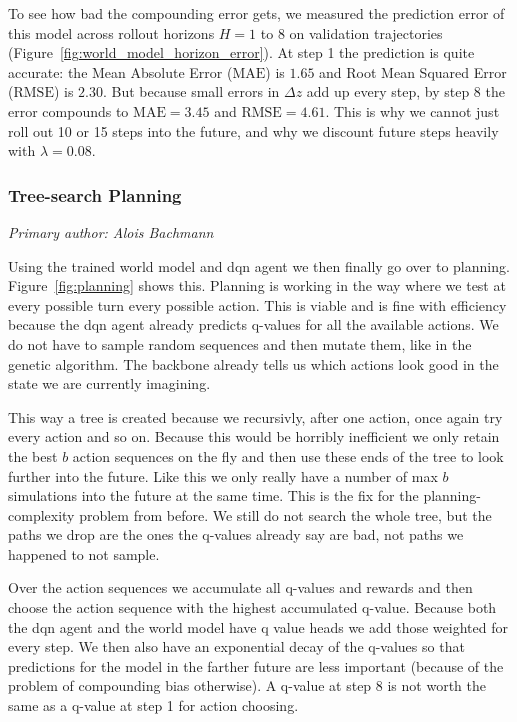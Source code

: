 To see how bad the compounding error gets, we measured the prediction error of this model across rollout horizons $H=1$ to $8$ on validation trajectories (Figure~\ref{fig:world_model_horizon_error}). At step 1 the prediction is quite accurate: the Mean Absolute Error ($\text{MAE}$) is $1.65$ and Root Mean Squared Error ($\text{RMSE}$) is $2.30$. But because small errors in $\Delta z$ add up every step, by step 8 the error compounds to $\text{MAE} = 3.45$ and $\text{RMSE} = 4.61$. This is why we cannot just roll out 10 or 15 steps into the future, and why we discount future steps heavily with $\lambda = 0.08$.

\subsubsection{Tree-search Planning}

\textit{Primary author: Alois Bachmann}

Using the trained world model and dqn agent we then finally go over to planning. Figure~\ref{fig:planning} shows this. Planning is working in the way where we test at every possible turn every possible action. This is viable and is fine with efficiency because the dqn agent already predicts q-values for all the available actions. We do not have to sample random sequences and then mutate them, like in the genetic algorithm. The backbone already tells us which actions look good in the state we are currently imagining.

This way a tree is created because we recursivly, after one action, once again try every action and so on. Because this would be horribly inefficient we only retain the best $b$ action sequences on the fly and then use these ends of the tree to look further into the future. Like this we only really have a number of max $b$ simulations into the future at the same time. This is the fix for the planning-complexity problem from before. We still do not search the whole tree, but the paths we drop are the ones the q-values already say are bad, not paths we happened to not sample.

Over the action sequences we accumulate all q-values and rewards and then choose the action sequence with the highest accumulated q-value. Because both the dqn agent and the world model have q value heads we add those weighted for every step. We then also have an exponential decay of the q-values so that predictions for the model in the farther future are less important (because of the problem of compounding bias otherwise). A q-value at step 8 is not worth the same as a q-value at step 1 for action choosing.


